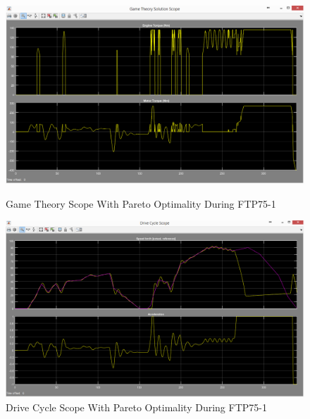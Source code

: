 \begin{figure}[hp]
\centering
\includegraphics[scale=0.485]{figures/Pareto/FTP75-1/gameTheory30Juni}
\caption{Game Theory Scope With Pareto Optimality During FTP75-1}
\label{fig:gtpo1}
\includegraphics[scale=0.46]{figures/Pareto/FTP75-1/driveCycle30Juni}
\caption{Drive Cycle Scope With Pareto Optimality During FTP75-1}
\label{fig:dcpo1}
\end{figure}


